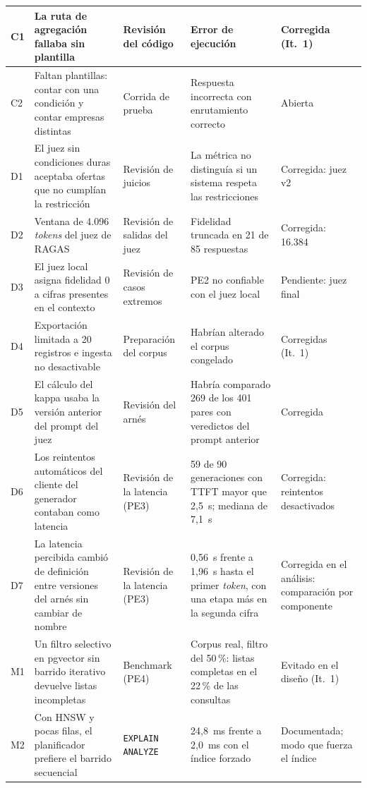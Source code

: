 {\begin{longtable}{|p{0.6cm}|p{4.4cm}|p{2.8cm}|p{3.6cm}|p{2.6cm}|}
    \hline
    C1 & La ruta de agregación fallaba sin plantilla & Revisión del código & Error de ejecución & Corregida (It.~1) \\
    \hline
    C2 & Faltan plantillas: contar con una condición y contar empresas distintas & Corrida de prueba & Respuesta incorrecta con enrutamiento correcto & Abierta \\
    \hline
    D1 & El juez sin condiciones duras aceptaba ofertas que no cumplían la restricción & Revisión de juicios & La métrica no distinguía si un sistema respeta las restricciones & Corregida: juez v2 \\
    \hline
    D2 & Ventana de 4.096 \textit{tokens} del juez de RAGAS & Revisión de salidas del juez & Fidelidad truncada en 21 de 85 respuestas & Corregida: 16.384 \\
    \hline
    D3 & El juez local asigna fidelidad 0 a cifras presentes en el contexto & Revisión de casos extremos & PE2 no confiable con el juez local & Pendiente: juez final \\
    \hline
    D4 & Exportación limitada a 20 registros e ingesta no desactivable & Preparación del corpus & Habrían alterado el corpus congelado & Corregidas (It.~1) \\
    \hline
    D5 & El cálculo del kappa usaba la versión anterior del prompt del juez & Revisión del arnés & Habría comparado 269 de los 401 pares con veredictos del prompt anterior & Corregida \\
    \hline
    D6 & Los reintentos automáticos del cliente del generador contaban como latencia & Revisión de la latencia (PE3) & 59 de 90 generaciones con TTFT mayor que 2,5~s; mediana de 7,1~s & Corregida: reintentos desactivados \\
    \hline
    D7 & La latencia percibida cambió de definición entre versiones del arnés sin cambiar de nombre & Revisión de la latencia (PE3) & 0,56~s frente a 1,96~s hasta el primer \textit{token}, con una etapa más en la segunda cifra & Corregida en el análisis: comparación por componente \\
    \hline
    M1 & Un filtro selectivo en pgvector sin barrido iterativo devuelve listas incompletas & Benchmark (PE4) & Corpus real, filtro del 50\,\%: listas completas en el 22\,\% de las consultas & Evitado en el diseño (It.~1) \\
    \hline
    M2 & Con HNSW y pocas filas, el planificador prefiere el barrido secuencial & \texttt{EXPLAIN ANALYZE} & 24,8~ms frente a 2,0~ms con el índice forzado & Documentada; modo que fuerza el índice \\
    \hline
\end{longtable}
}

